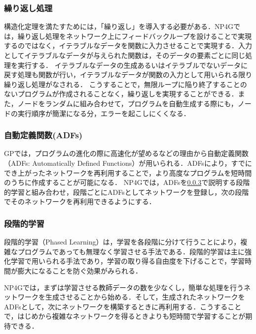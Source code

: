 \documentclass[exploratorypaper]{jsaiart} %
\begin{document}
\subsubsection{繰り返し処理}
構造化定理を満たすためには，「繰り返し」を導入する必要がある．NP4Gでは，繰り返し処理をネットワーク上にフィードバックループを設けることで実現するのではなく，イテラブルなデータを関数に入力させることで実現する．入力としてイテラブルなデータが与えられた関数は，そのデータの要素ごとに同じ処理を実行する．
イテラブルなデータの生成あるいはイテラブルでないデータに戻す処理も関数が行い，イテラブルなデータが関数の入力として用いられる限り繰り返し処理がなされる．
こうすることで，無限ループに陥り終了することのないプログラムが作成されることなく，繰り返しを実現することができる．また，ノードをランダムに組み合わせて，プログラムを自動生成する際にも，ノードの実行順序が簡潔になる分，エラーを起こしにくくなる．

\subsubsection{自動定義関数(ADFs)}
GPでは，プログラムの進化の際に高速化が望めるなどの理由から自動定義関数（ADFs: Automatically Defined Functions）が用いられる\cite{adfs}．ADFsにより，すでにでき上がったネットワークを再利用することで，より高度なプログラムを短時間のうちに作成することが可能になる．
NP4Gでは，ADFsを\ref{sec:PL}で説明する段階的学習と組み合わせ，段階ごとにADFsとしてネットワークを登録し，次の段階でそのネットワークを再利用できるようにする．

\subsubsection{段階的学習}
\label{sec:PL}
段階的学習（Phased Learning）は，学習を各段階に分けて行うことにより，複雑なプログラムであっても無理なく学習させる手法である．段階的学習は主に強化学習で用いられる手法であり，学習の取り得る自由度を下げることで，学習時間が膨大になることを防ぐ効果がみられる\cite{hodohara2012reinforcement}．

NP4Gでは，まずは学習させる教師データの数を少なくし，簡単な処理を行うネットワークを生成させることから始める．そして，生成されたネットワークをADFsとして，次にネットワークを構築するときに再利用する．こうすることで，はじめから複雑なネットワークを得るときよりも短時間で学習することが期待できる．
\end{document}
